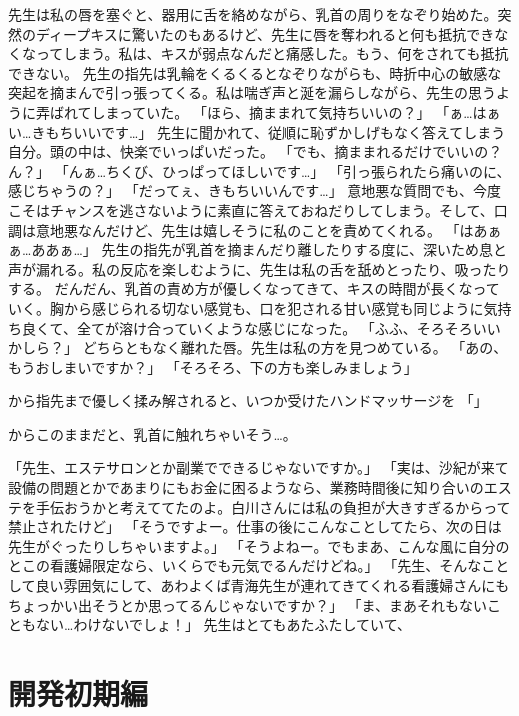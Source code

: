 先生は私の唇を塞ぐと、器用に舌を絡めながら、乳首の周りをなぞり始めた。突然のディープキスに驚いたのもあるけど、先生に唇を奪われると何も抵抗できなくなってしまう。私は、キスが弱点なんだと痛感した。もう、何をされても抵抗できない。
先生の指先は乳輪をくるくるとなぞりながらも、時折中心の敏感な突起を摘まんで引っ張ってくる。私は喘ぎ声と涎を漏らしながら、先生の思うように弄ばれてしまっていた。
「ほら、摘ままれて気持ちいいの？」
「ぁ…はぁい…きもちいいです…」
先生に聞かれて、従順に恥ずかしげもなく答えてしまう自分。頭の中は、快楽でいっぱいだった。
「でも、摘ままれるだけでいいの？ん？」
「んぁ…ちくび、ひっぱってほしいです…」
「引っ張られたら痛いのに、感じちゃうの？」
「だってぇ、きもちいいんです…」
意地悪な質問でも、今度こそはチャンスを逃さないように素直に答えておねだりしてしまう。そして、口調は意地悪なんだけど、先生は嬉しそうに私のことを責めてくれる。
「はあぁぁ…ああぁ…」
先生の指先が乳首を摘まんだり離したりする度に、深いため息と声が漏れる。私の反応を楽しむように、先生は私の舌を舐めとったり、吸ったりする。
だんだん、乳首の責め方が優しくなってきて、キスの時間が長くなっていく。胸から感じられる切ない感覚も、口を犯される甘い感覚も同じように気持ち良くて、全てが溶け合っていくような感じになった。
「ふふ、そろそろいいかしら？」
どちらともなく離れた唇。先生は私の方を見つめている。
「あの、もうおしまいですか？」
「そろそろ、下の方も楽しみましょう」






から指先まで優しく揉み解されると、いつか受けたハンドマッサージを
「」





からこのままだと、乳首に触れちゃいそう…。




「先生、エステサロンとか副業でできるじゃないですか。」
「実は、沙紀が来て設備の問題とかであまりにもお金に困るようなら、業務時間後に知り合いのエステを手伝おうかと考えててたのよ。白川さんには私の負担が大きすぎるからって禁止されたけど」
「そうですよー。仕事の後にこんなことしてたら、次の日は先生がぐったりしちゃいますよ。」
「そうよねー。でもまあ、こんな風に自分のとこの看護婦限定なら、いくらでも元気でるんだけどね。」
「先生、そんなことして良い雰囲気にして、あわよくば青海先生が連れてきてくれる看護婦さんにもちょっかい出そうとか思ってるんじゃないですか？」
「ま、まあそれもないこともない…わけないでしょ！」
先生はとてもあたふたしていて、


\chapter{開発初期編}
